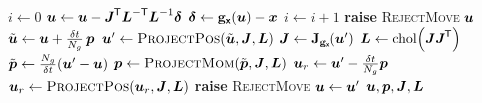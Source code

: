 \begin{multicols}{2}
\begin{algorithmic}
         \State $i \gets 0$
         \label{ln:convergence-check}
             \State $\boldsymbol{u} \gets \boldsymbol{u} - \boldsymbol{J}^{\mkern-1.5mu\mathsf{T}} \boldsymbol{L}^{-\textsf{T}} \boldsymbol{L}^{-1} \boldsymbol{\delta}$
             \State $\boldsymbol{\delta} \gets {\mathbf{g}}_{\boldsymbol{\mathsf{x}}}(\boldsymbol{u}) - \boldsymbol{x}$
             \State $i \gets i + 1$
         \EndWhile
           \State \textbf{raise}  \textsc{RejectMove} \label{ln:non-convergence} 
         \EndIf
         \State \Return $\boldsymbol{u}$
    \EndFunction
    \State %
    \vspace{-2mm}
            \State $\tilde{\boldsymbol{u}} \gets \boldsymbol{u} + \frac{\delta t}{N_g} \,\boldsymbol{p}$
            \State $\vct{u}' \gets \Call{ProjectPos}{\tilde{\vct{u}}, \mtx{J}, \mtx{L}}$
            \State $\mtx{J} \gets \jacob{\genfunc_{\rvct{x}}}{\vct{u}'}$
            \State $\mtx{L} \gets \chol \lpa \mtx{J}\mtx{J}\tr \rpa$ \label{ln:chmc-cholesky}
            \State $\tilde{\vct{p}} \gets \frac{N_g}{\delta t}\lpa \vct{u}' - \vct{u} \rpa$
            \State $\vct{p} \gets \Call{ProjectMom}{\tilde{\vct{p}},\mtx{J},\mtx{L}}$
            \State $\boldsymbol{u}_r \gets \boldsymbol{u}' - \frac{\delta t}{N_g} \boldsymbol{p}$
            \State $\vct{u}_r \gets \Call{ProjectPos}{\vct{u}_r, \mtx{J}, \mtx{L}}$
              \State \textbf{raise} \textsc{RejectMove}\label{ln:reverse-check}
            \EndIf
            \State $\boldsymbol{u} \gets \boldsymbol{u}'$
        \EndFor        
        \State \Return $\boldsymbol{u},\boldsymbol{p},\boldsymbol{J},\boldsymbol{L}$
    \EndFunction
\end{algorithmic}
\end{multicols}